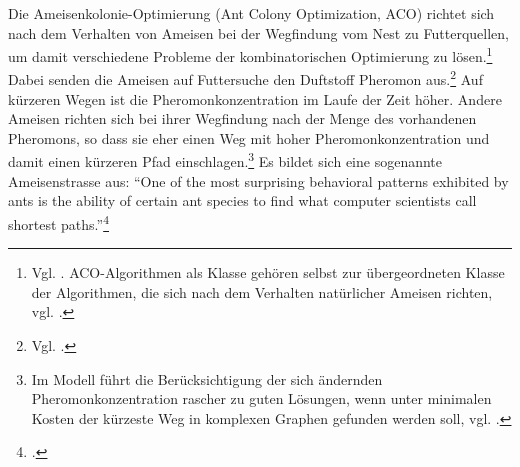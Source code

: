 Die Ameisenkolonie-Optimierung (Ant Colony Optimization, ACO) richtet sich nach dem Verhalten von Ameisen bei der Wegfindung vom Nest zu Futterquellen, um damit verschiedene Probleme der kombinatorischen Optimierung zu lösen.\footnote{Vgl. \citet*[S. 1]{sch-koa}. ACO-Algorithmen als Klasse gehören selbst zur übergeordneten Klasse der Algorithmen, die sich nach dem Verhalten natürlicher Ameisen richten, vgl. \citet*[S. 22]{ds-ant}.} Dabei senden die Ameisen auf Futtersuche den Duftstoff Pheromon aus.\footnote{Vgl. \citet*[S. 1\,ff.]{ds-ant}.} Auf kürzeren Wegen ist die Pheromonkonzentration im Laufe der Zeit höher. Andere Ameisen richten sich bei ihrer Wegfindung nach der Menge des vorhandenen Pheromons, so dass sie eher einen Weg mit hoher Pheromonkonzentration und damit einen kürzeren Pfad einschlagen.\footnote{Im Modell führt die Berücksichtigung der sich ändernden Pheromonkonzentration rascher zu guten Lösungen, wenn unter minimalen Kosten der kürzeste Weg in komplexen Graphen gefunden werden soll, vgl. \citet*[S. 9\,ff.; 22]{ds-ant}.} Es bildet sich eine sogenannte Ameisenstrasse aus: \enquote{One of the most surprising behavioral patterns exhibited by ants is the ability of certain ant species to find what computer scientists call shortest paths.}\footnote{\citet*[S. IX]{ds-ant}.}

